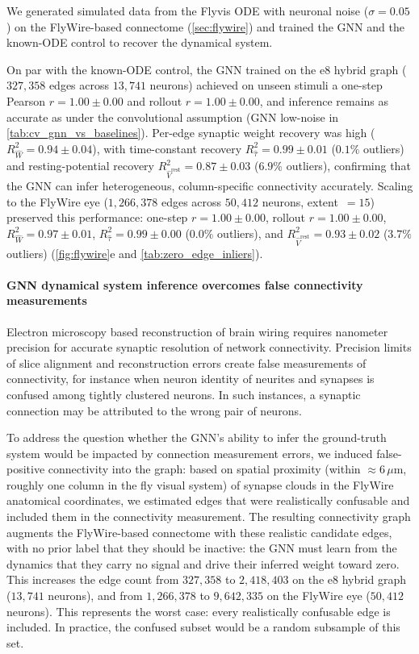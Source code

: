 \documentclass{article}
\begin{document}
We generated simulated data from the Flyvis ODE with neuronal noise ($\sigma=0.05$) on the FlyWire-based connectome (\cref{sec:flywire}) and trained the GNN and the known-ODE control to recover the dynamical system. 

On par with the known-ODE control, the GNN trained on the e8 hybrid graph ($327{,}358$ edges across $13{,}741$ neurons) achieved on unseen stimuli a one-step Pearson $r = 1.00 \pm 0.00$ and rollout $r = 1.00 \pm 0.00$, and inference remains as accurate as under the convolutional assumption (GNN low-noise in \cref{tab:cv_gnn_vs_baselines}). Per-edge synaptic weight recovery was high ($R^2_{\hat{W}} = 0.94 \pm 0.04$), with time-constant recovery $R^2_{\hat{\tau}} = 0.99 \pm 0.01$ ($0.1\%$ outliers) and resting-potential recovery $R^2_{\hat{V}^{\mathrm{rest}}} = 0.87 \pm 0.03$ ($6.9\%$ outliers), confirming that the GNN can infer heterogeneous, column-specific connectivity accurately. Scaling to the FlyWire eye ($1{,}266{,}378$ edges across $50{,}412$ neurons, extent~$=15$) preserved this performance: one-step $r = 1.00 \pm 0.00$, rollout $r = 1.00 \pm 0.00$, $R^2_{\hat{W}} = 0.97 \pm 0.01$, $R^2_{\hat{\tau}} = 0.99 \pm 0.00$ ($0.0\%$ outliers), and $R^2_{\hat{V}^{\mathrm{rest}}} = 0.93 \pm 0.02$ ($3.7\%$ outliers) (\cref{fig:flywire}e and \cref{tab:zero_edge_inliers}).

\paragraph{GNN dynamical system inference overcomes false connectivity measurements}

Electron microscopy based reconstruction of brain wiring requires nanometer precision for accurate synaptic resolution of network connectivity. Precision limits of slice alignment and reconstruction errors create false measurements of connectivity, for instance when neuron identity of neurites and synapses is confused among tightly clustered neurons. In such instances, a synaptic connection may be attributed to the wrong pair of neurons.

To address the question whether the GNN's ability to infer the ground-truth system would be impacted by connection measurement errors, we induced false-positive connectivity into the graph: based on spatial proximity (within $\approx\!6\,\mu$m, roughly one column in the fly visual system) of synapse clouds in the FlyWire anatomical coordinates, we estimated edges that were realistically confusable and included them in the connectivity measurement. The resulting connectivity graph augments the FlyWire-based connectome with these realistic candidate edges, with no prior label that they should be inactive: the GNN must learn from the dynamics that they carry no signal and drive their inferred weight toward zero. This increases the edge count from $327{,}358$ to $2{,}418{,}403$ on the e8 hybrid graph ($13{,}741$ neurons), and from $1{,}266{,}378$ to $9{,}642{,}335$ on the FlyWire eye ($50{,}412$ neurons). This represents the worst case: every realistically confusable edge is included. In practice, the confused subset would be a random subsample of this set.
\end{document}
